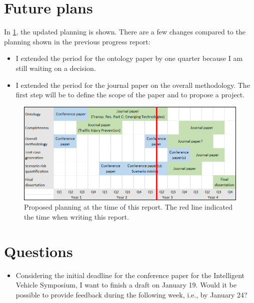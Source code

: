 \documentclass[10pt,final,a4paper,oneside,onecolumn]{article}
\begin{document}
\section{Future plans}

In \cref{fig:planning}, the updated planning is shown. There are a few changes compared to the planning shown in the previous progress report:
\begin{itemize}
	\item I extended the period for the ontology paper by one quarter because I am still waiting on a decision. 
	\item I extended the period for the journal paper on the overall methodology. The first step will be to define the scope of the paper and to propose a project. 
\end{itemize}

\begin{figure}[t]
	\centering
	\includegraphics[width=\linewidth]{planning.png}
	\caption{Proposed planning at the time of this report. The red line indicated the time when writing this report.}
	\label{fig:planning}
\end{figure}

\section{Questions}

\begin{itemize}
	\item Considering the initial deadline for the conference paper for the Intelligent Vehicle Symposium, I want to finish a draft on January 19. Would it be possible to provide feedback during the following week, i.e., by January 24?
\end{itemize}


\printbibliography

\clearpage

\end{document}
